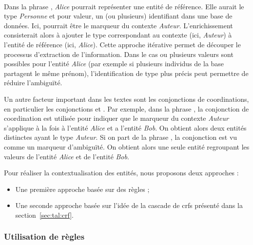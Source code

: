 \paragraph{}
Dans la phrase , \emph{Alice} pourrait représenter une entité de référence.
Elle aurait le type \emph{Personne} et pour valeur, un (ou plusieurs) identifiant dans une base de données.
Ici,  pourrait être le marqueur du contexte \emph{Auteur}.
L'enrichissement consisterait alors à ajouter le type correspondant au contexte (ici, \emph{Auteur}) à l'entité de référence (ici, \emph{Alice}).
Cette approche itérative permet de découper le processus d'extraction de l'information.
Dans le cas ou plusieurs valeurs sont possibles pour l'entité \emph{Alice} (par exemple si plusieurs individus de la base partagent le même prénom), l'identification de type plus précis peut permettre de réduire l'ambiguïté.

Un autre facteur important dans les textes sont les conjonctions de coordinations, en particulier les conjonctions  et .
Par exemple, dans la phrase , la conjonction de coordination  est utilisée pour indiquer que le marqueur du contexte \emph{Auteur} s'applique à la fois à l'entité \emph{Alice} et a l'entité \emph{Bob}.
On obtient alors deux entités distinctes ayant le type \emph{Auteur}.
Si on part de la phrase , la conjonction  est vu comme un marqueur d'ambiguïté.
On obtient alors une seule entité regroupant les valeurs de l'entité \emph{Alice} et de l'entité \emph{Bob}.

Pour réaliser la contextualisation des entités, nous proposons deux approches :
\begin{itemize}
      \item Une première approche basée sur des règles ;
      \item Une seconde approche basée sur l'idée de la cascade de \glspl{crf} présenté dans la section~\ref{sec:tal:crf}.
\end{itemize}

\subsubsection{Utilisation de règles}
\label{sec:tal:ctx:rule}

